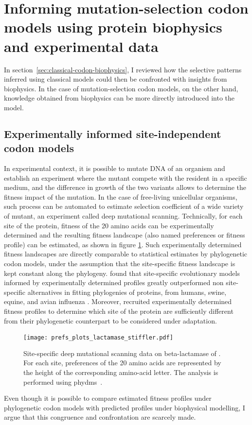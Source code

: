 \section{Informing mutation-selection codon models using protein biophysics and experimental data}
\label{sec:mechanistic-codon-biophysics}

In section~\ref{sec:classical-codon-biophysics}, I reviewed how the selective patterns inferred using classical models could then be confronted with insights from biophysics.
In the case of mutation-selection codon models, on the other hand, knowledge obtained from biophysics can be more directly introduced into the model.

\subsection{Experimentally informed site-independent codon models}

In experimental context, it is possible to mutate DNA of an organism and establish an experiment where the mutant compete with the resident in a specific medium, and the difference in growth of the two variants allows to determine the fitness impact of the mutation.
In the case of free-living unicellular organisms, such process can be automated to estimate selection coefficient of a wide variety of mutant, an experiment called deep mutational scanning.
Technically, for each site of the protein, fitness of the 20 amino acids can be experimentally determined and the resulting fitness landscape (also named preferences or fitness profile) can be estimated, as shown in figure \ref{fig:intro-deep-mut-profile}.
Such experimentally determined fitness landscapes are directly comparable to statistical estimates by phylogenetic codon models, under the assumption that the site-specific fitness landscape is kept constant along the phylogeny.
\citet{Bloom2014,Bloom2014a} found that site-specific evolutionary models informed by experimentally determined profiles greatly outperformed non site-specific alternatives in fitting phylogenies of proteins, from humans, swine, equine, and avian influenza \citep{Doud2015} .
Moreover, \citet{Bloom2017} recruited experimentally determined fitness profiles to determine which site of the protein are sufficiently different from their phylogenetic counterpart to be considered under adaptation.

\begin{figure}[H]
    \centering
    \texttt{[image: prefs\_plots\_lactamase\_stiffler.pdf]}
    \caption[Deep mutational scanning profile]{
    Site-specific deep mutational scanning data on beta-lactamase of \citet{Stiffler2015}.
    For each site, preferences of the 20 amino acids are represented by the height of the corresponding amino-acid letter.
    The analysis is performed using phydms~\citep{Hilton2017}.}
    \label{fig:intro-deep-mut-profile}
\end{figure}
Even though it is possible to compare estimated fitness profiles under phylogenetic codon models with predicted profiles under biophysical modelling, I argue that this congruence and confrontation are scarcely made.

